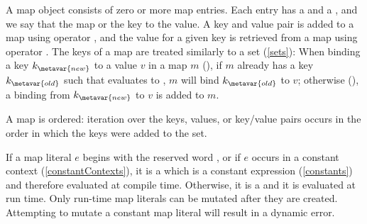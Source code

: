 \documentclass[makeidx]{article}
\begin{document}
{\LMHash{}%
A map object consists of zero or more map entries.
Each entry has a  and a ,
and we say that the map
 or
the key to the value.
A key and value pair is
added to a map using operator \lit{[]=},
and the value for a given key is retrieved from a map using operator \lit{[]}.
The keys of a map are treated similarly to a set
(\ref{sets}):
When binding a key $k_{\metavar{new}}$ to a value $v$ in a map $m$
(),
if $m$ already has a key $k_{\metavar{old}}$ such that
 evaluates to \TRUE,
$m$ will bind $k_{\metavar{old}}$ to $v$;
otherwise
(),
a binding from $k_{\metavar{new}}$ to $v$ is added to $m$.

\LMHash{}%
A map is ordered: iteration over the keys, values, or key/value pairs
occurs in the order in which the keys were added to the set.


\LMHash{}%
If a map literal $e$ begins with the reserved word \CONST{},
or if $e$ occurs in a constant context
(\ref{constantContexts}),
it is a
which is a constant expression
(\ref{constants})
and therefore evaluated at compile time.
Otherwise, it is a
and it is evaluated at run time.
Only run-time map literals can be mutated after they are created.
Attempting to mutate a constant map literal will result in a dynamic error.


}
\end{document}
